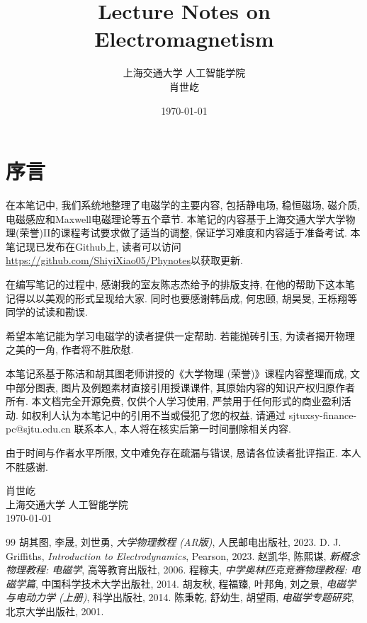 \documentclass[12pt,a4paper,oneside]{report}
\title{\Huge\textbf{Lecture Notes on Electromagnetism}}
\author{\Large 上海交通大学 人工智能学院 \\
\Large 肖世屹}
\date{\today}
\theoremstyle{definition}
\theoremstyle{remark}
\begin{document}
\maketitle
\thispagestyle{empty}
\clearpage
\chapter*{序言}

在本笔记中, 我们系统地整理了电磁学的主要内容,
包括静电场, 稳恒磁场, 磁介质, 电磁感应和Maxwell电磁理论等五个章节. 本笔记的内容基于上海交通大学大学物理(荣誉)II的课程考试要求做了适当的调整, 保证学习难度和内容适于准备考试.
本笔记现已发布在Github上, 读者可以访问\url{https://github.com/ShiyiXiao05/Phynotes}以获取更新.

在编写笔记的过程中, 感谢我的室友陈志杰给予的排版支持, 在他的帮助下这本笔记得以以美观的形式呈现给大家. 同时也要感谢韩岳成, 何忠颐, 胡昊旻, 王栎翔等同学的试读和勘误.

希望本笔记能为学习电磁学的读者提供一定帮助. 若能抛砖引玉, 为读者揭开物理之美的一角, 作者将不胜欣慰.

本笔记系基于陈洁和胡其图老师讲授的《大学物理 (荣誉)》课程内容整理而成, 文中部分图表, 图片及例题素材直接引用授课课件, 其原始内容的知识产权归原作者所有. 本文档完全开源免费, 仅供个人学习使用, 严禁用于任何形式的商业盈利活动. 如权利人认为本笔记中的引用不当或侵犯了您的权益, 请通过 sjtuxsy-finance-pc@sjtu.edu.cn 联系本人, 本人将在核实后第一时间删除相关内容.

由于时间与作者水平所限, 文中难免存在疏漏与错误, 恳请各位读者批评指正. 本人不胜感谢.
\bigskip
\begin{flushright}
肖世屹 \\
上海交通大学 人工智能学院 \\
\today
\end{flushright}
\clearpage

\tableofcontents
\clearpage








\begin{thebibliography}{99}
 胡其图, 李晟, 刘世勇, \textit{大学物理教程 (AR版)}, 人民邮电出版社, 2023.
 D. J. Griffiths, \textit{Introduction to Electrodynamics}, Pearson, 2023.
 赵凯华, 陈熙谋, \textit{新概念物理教程: 电磁学}, 高等教育出版社, 2006.
 程稼夫, \textit{中学奥林匹克竞赛物理教程: 电磁学篇}, 中国科学技术大学出版社, 2014.
 胡友秋, 程福臻, 叶邦角, 刘之景, \textit{电磁学与电动力学 (上册)}, 科学出版社, 2014.
 陈秉乾, 舒幼生, 胡望雨, \textit{电磁学专题研究}, 北京大学出版社, 2001.

\end{thebibliography}
\end{document}
